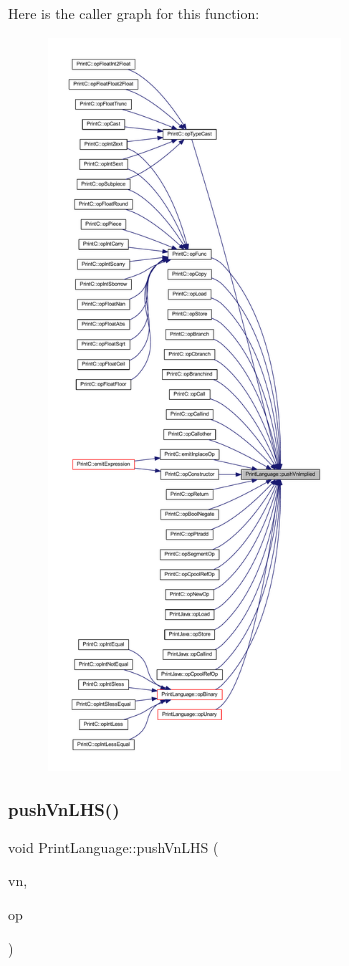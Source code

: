 Here is the caller graph for this function\+:
\nopagebreak
\begin{figure}[H]
\begin{center}
\leavevmode
\includegraphics[height=550pt]{class_print_language_a5979bdf12bfe420ae6bba713bc3d7faf_icgraph}
\end{center}
\end{figure}
\mbox{\label{class_print_language_a955ef5ecf066b283738b23abe925f67c}} 
\subsubsection{\texorpdfstring{pushVnLHS()}{pushVnLHS()}}
{\footnotesize\ttfamily void Print\+Language\+::push\+Vn\+L\+HS (\begin{DoxyParamCaption}\item[{const \mbox{\hyperlink{class_varnode}{Varnode}} $\ast$}]{vn,  }\item[{const \mbox{\hyperlink{class_pcode_op}{Pcode\+Op}} $\ast$}]{op }\end{DoxyParamCaption})\hspace{0.3cm}{\ttfamily [protected]}}



